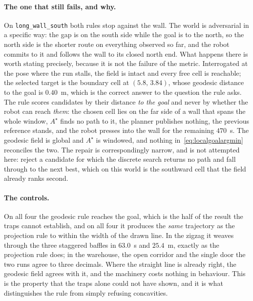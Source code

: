 \documentclass[11pt,a4paper]{article}
\newcommand{\astar}{$A^\star$}
\begin{document}
\paragraph{The one that still fails, and why.} On \texttt{long\_wall\_south} both rules stop against the
wall. The world is adversarial in a specific way: the gap is on the south side while the goal is to the
north, so the north side is the shorter route on everything observed so far, and the robot commits to it and
follows the wall to its closed north end. What happens there is worth stating precisely, because it is not
the failure of the metric. Interrogated at the pose where the run stalls, the field is intact and every free
cell is reachable; the selected target is the boundary cell at $(5.8,\,3.84)$, whose geodesic distance to
the goal is $0.40$~m, which is the correct answer to the question the rule
asks. The rule scores candidates by their distance \emph{to the goal} and never by whether the robot can
reach \emph{them}: the chosen cell lies on the far side of a wall that spans the whole window, \astar{}
finds no path to it, the planner publishes nothing, the previous reference stands, and the robot presses
into the wall for the remaining $470$~s. The geodesic field is global and \astar{} is windowed, and nothing
in~\eqref{eq:localgoalargmin} reconciles the two. The repair is correspondingly narrow, and is not attempted
here: reject a candidate for which the discrete search returns no path and fall through to the next best,
which on this world is the southward cell that the field already ranks second.

\paragraph{The controls.} On all four the geodesic rule reaches the goal, which is the half of the result
the traps cannot establish, and on all four it produces the \emph{same} trajectory as the projection rule to
within the width of the drawn line. In the zigzag it weaves through the three staggered baffles in
$63.0$~s and $25.4$~m, exactly as the projection rule does; in the warehouse, the open corridor and the
single door the two runs agree to three decimals. Where the straight line is already right, the geodesic
field agrees with it, and the machinery costs nothing in behaviour. This is the property that the traps
alone could not have shown, and it is what distinguishes the rule from simply refusing concavities.
\end{document}

